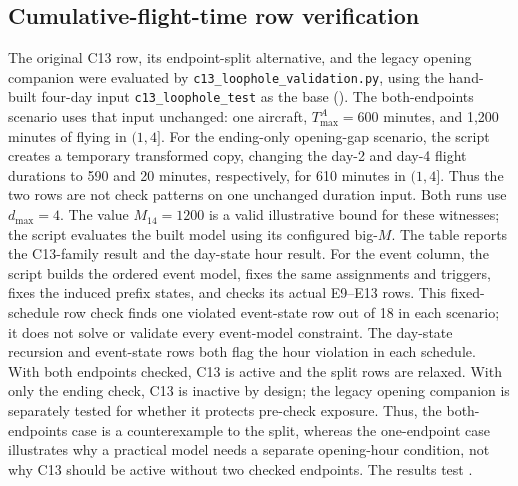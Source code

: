 \subsection{Cumulative-flight-time row verification}

The original C13 row, its endpoint-split alternative, and the legacy opening
companion were evaluated by
\texttt{c13\_loophole\_validation.py}, using the hand-built four-day input
\texttt{c13\_loophole\_test} as the base (). The
both-endpoints scenario uses that input unchanged: one aircraft,
$T^A_{\max}=600$ minutes, and 1,200 minutes of flying in $(1,4]$. For the
ending-only opening-gap scenario, the script creates a temporary transformed
copy, changing the day-2 and day-4 flight durations to 590 and 20 minutes,
respectively, for 610 minutes in $(1,4]$. Thus the two rows are not check
patterns on one unchanged duration input. Both runs use $d_{\max}=4$. The
value $M_{14}=1200$ is a valid illustrative bound for these witnesses; the
script evaluates the built model using its configured big-$M$. The table
reports the C13-family result and the day-state hour result. For the event
column, the script builds the ordered event model, fixes the same assignments
and triggers, fixes the induced prefix states, and checks its actual E9--E13
rows. This fixed-schedule row check finds one violated event-state row out of
18 in each scenario; it does not solve or validate every event-model
constraint. The day-state recursion and event-state rows both flag the hour
violation in each schedule. With both endpoints checked, C13 is active and the
split rows are relaxed. With only the ending check, C13 is inactive by design;
the legacy opening companion is separately tested for whether it protects
pre-check exposure. Thus, the both-endpoints case is a counterexample to the
split, whereas the one-endpoint case illustrates why a practical model needs
a separate opening-hour condition, not why C13 should be active without two
checked endpoints. The results test
.

